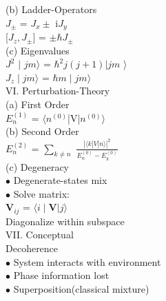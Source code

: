 \documentclass[10pt,fancy]{elegantbook}
\begin{document}
{(b) Ladder-Operators \\

$J_\pm$ = $J_x \pm$ i$J_y$ \\
 
[$J_z,J_\pm$] = $\pm \hbar J_\pm$  \\  

(c) Eigenvalues  \\ 

$J^2$ $\mid$ ${jm} \rangle$ = $\hbar^2j(j + 1)| {jm}$ $\rangle$ \\
 
$J_z \mid {jm} \rangle$ = $\hbar m \mid{jm} \rangle$  \\

VI. Perturbation-Theory  \\  

(a) First Order  \\  

$E_{n}^{(1)}$ = $\langle n^{(0)}$|V|$n^{(0)} \rangle$ \\ 

(b) Second Order  \\
  
$E_{n}^{(2)}$ = $\sum_{k \neq n}$ $\frac{| \langle {k}|{V}|{n} \rangle |^2}{E_{n}^{(0)} - E_{k}^{(0)}}$ \\ 
    
(c) Degeneracy \\
 
$\bullet$ Degenerate-states mix \\
 
$\bullet$ Solve matrix: \\
  
    $\mathbf V_{ij}$ = $\langle i\mid \mathbf {V}|j \rangle$ \\
 
    Diagonalize within subspace \\

VII. Conceptual \\ 

Decoherence \\  

$\bullet$ System interacts with environment \\
 
$\bullet$ Phase information lost \\
 
$\bullet$ Superposition(classical mixture)  \\
  
}
\end{document}
